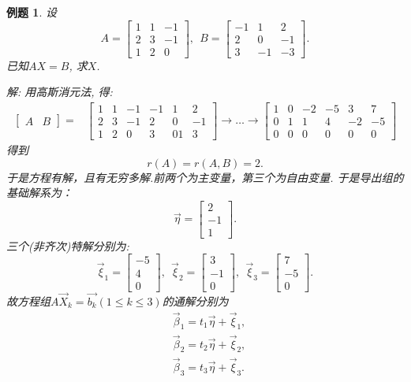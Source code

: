 \documentclass[a4paper]{book}
\newtheorem{eg}{例题}[chapter]
\begin{document}
\begin{eg}
设
\begin{displaymath}
A=\begin{bmatrix}1&1&-1\\2&3&-1\\1&2&0\end{bmatrix},\ \ B=\begin{bmatrix}-1&1&2\\2&0&-1\\3&-1&-3\end{bmatrix}.\end{displaymath}
已知$AX=B$, 求$X$.

解: 用高斯消元法, 得:
\begin{displaymath}\begin{aligned}
\begin{bmatrix}A&B\end{bmatrix}=&\begin{bmatrix}1&1&-1&-1&1&2\\2&3&-1&2&0&-1
\\1&2&0&3&01&3\end{bmatrix}\rightarrow\dots\rightarrow\begin{bmatrix}
1&0&-2&-5&3&7\\0&1&1&4&-2&-5\\0&0&0&0&0&0\end{bmatrix}\end{aligned}\end{displaymath}
得到$$r(A)=r(A,B)=2.$$于是方程有解，且有无穷多解.前两个为主变量，第三个为自由变量. 于是导出组的基础解系为：
$$\vec{\eta}=\begin{bmatrix}2\\-1\\1\end{bmatrix}.$$
三个(非齐次)特解分别为:
\begin{displaymath}
\vec{\xi}_1=\begin{bmatrix}-5\\4\\0\end{bmatrix},\ \ \vec{\xi}_2=\begin{bmatrix}3\\-1\\0\end{bmatrix},\ \ \vec{\xi}_3=\begin{bmatrix}7\\-5\\0\end{bmatrix}.
\end{displaymath}
故方程组$A\vec{X}_k=\vec{b_k}(1\leq k \leq 3)$的通解分别为
\begin{displaymath}\begin{aligned}
&\vec{\beta}_1=t_1\vec{\eta}+\vec{\xi}_1,\\
&\vec{\beta}_2=t_2\vec{\eta}+\vec{\xi}_2,\\
&\vec{\beta}_3=t_3\vec{\eta}+\vec{\xi}_3.\end{aligned}\end{displaymath}


\end{eg}
\end{document}
